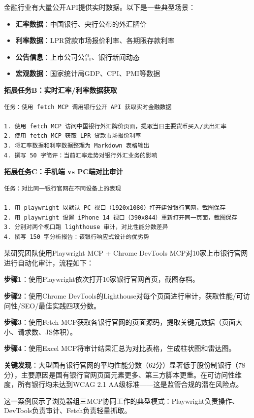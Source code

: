 金融行业有大量公开API提供实时数据。以下是一些典型场景：

\begin{itemize}[leftmargin=2em]
  \item \textbf{汇率数据}：中国银行、央行公布的外汇牌价
  \item \textbf{利率数据}：LPR贷款市场报价利率、各期限存款利率
  \item \textbf{公告信息}：上市公司公告、银行新闻动态
  \item \textbf{宏观数据}：国家统计局GDP、CPI、PMI等数据
\end{itemize}

\textbf{拓展任务B：实时汇率/利率数据获取}

\begin{lstlisting}
任务：使用 fetch MCP 调用银行公开 API 获取实时金融数据

1. 使用 fetch MCP 访问中国银行外汇牌价页面，提取当日主要货币买入/卖出汇率
2. 使用 fetch MCP 获取 LPR 贷款市场报价利率
3. 将汇率数据和利率数据整理为 Markdown 表格输出
4. 撰写 50 字简评：当前汇率走势对银行外汇业务的影响
\end{lstlisting}

\textbf{拓展任务C：手机端 vs PC端对比审计}

\begin{lstlisting}
任务：对比同一银行官网在不同设备上的表现

1. 用 playwright 以默认 PC 视口（1920x1080）打开建设银行官网，截图保存
2. 用 playwright 设置 iPhone 14 视口（390x844）重新打开同一页面，截图保存
3. 分别对两个视口跑 lighthouse 审计，对比性能分数差异
4. 撰写 150 字分析报告：该银行响应式设计的优劣势
\end{lstlisting}

\begin{casebox}[上市银行官网可用性对比分析案例]
某研究团队使用Playwright MCP + Chrome DevTools MCP对10家上市银行官网进行自动化审计，流程如下：

\textbf{步骤1}：使用Playwright依次打开10家银行官网首页，截图存档。

\textbf{步骤2}：使用Chrome DevTools的Lighthouse对每个页面进行审计，获取性能/可访问性/SEO/最佳实践四项分数。

\textbf{步骤3}：使用Fetch MCP获取各银行官网的页面源码，提取关键元数据（页面大小、请求数、JS体积）。

\textbf{步骤4}：使用Excel MCP将审计结果汇总为对比表格，生成柱状图和雷达图。

\textbf{关键发现}：大型国有银行官网的平均性能分数（62分）显著低于股份制银行（78分），主要原因是国有银行官网页面元素更多、第三方脚本更重。在可访问性维度，所有银行均未达到WCAG 2.1 AA级标准——这是监管合规的潜在风险点。

这一案例展示了浏览器组三MCP协同工作的典型模式：Playwright负责操作、DevTools负责审计、Fetch负责轻量抓取。
\end{casebox}

